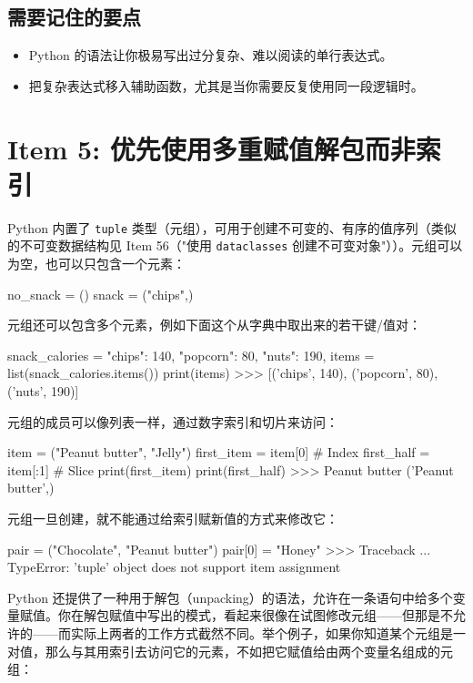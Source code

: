 \subsection{需要记住的要点}

\begin{itemize}
\item Python 的语法让你极易写出过分复杂、难以阅读的单行表达式。
\item 把复杂表达式移入辅助函数，尤其是当你需要反复使用同一段逻辑时。
\end{itemize}

\section{Item 5: 优先使用多重赋值解包而非索引}

Python 内置了 \texttt{tuple} 类型（元组），可用于创建不可变的、有序的值序列（类似的不可变数据结构见 Item 56（"使用 \texttt{dataclasses} 创建不可变对象"））。元组可以为空，也可以只包含一个元素：

\begin{codebox}[python]
no_snack = ()
snack = ("chips",)
\end{codebox}

元组还可以包含多个元素，例如下面这个从字典中取出来的若干键/值对：

\begin{codebox}[python]
snack_calories = {
    "chips": 140,
    "popcorn": 80,
    "nuts": 190,
}
items = list(snack_calories.items())
print(items)
>>>
[('chips', 140), ('popcorn', 80), ('nuts', 190)]
\end{codebox}

元组的成员可以像列表一样，通过数字索引和切片来访问：

\begin{codebox}[python]
item = ("Peanut butter", "Jelly")
first_item = item[0]   # Index
first_half = item[:1]  # Slice
print(first_item)
print(first_half)
>>>
Peanut butter
('Peanut butter',)
\end{codebox}

元组一旦创建，就不能通过给索引赋新值的方式来修改它：

\begin{codebox}[python]
pair = ("Chocolate", "Peanut butter")
pair[0] = "Honey"
>>>
Traceback ...
TypeError: 'tuple' object does not support item assignment
\end{codebox}

Python 还提供了一种用于解包（unpacking）的语法，允许在一条语句中给多个变量赋值。你在解包赋值中写出的模式，看起来很像在试图修改元组——但那是不允许的——而实际上两者的工作方式截然不同。举个例子，如果你知道某个元组是一对值，那么与其用索引去访问它的元素，不如把它赋值给由两个变量名组成的元组：


